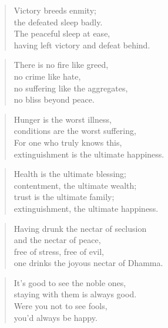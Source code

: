 \documentclass[12pt,openany]{book}%
\begin{document}
\begin{verse}%
Victory breeds enmity; \\
the defeated sleep badly. \\
The peaceful sleep at ease, \\
having left victory and defeat behind. 

%
\end{verse}

\begin{verse}%
There is no fire like greed, \\
no crime like hate, \\
no suffering like the aggregates, \\
no bliss beyond peace. 

%
\end{verse}

\begin{verse}%
Hunger is the worst illness, \\
conditions are the worst suffering, \\
For one who truly knows this, \\
extinguishment is the ultimate happiness. 

%
\end{verse}

\begin{verse}%
Health is the ultimate blessing; \\
contentment, the ultimate wealth; \\
trust is the ultimate family; \\
extinguishment, the ultimate happiness. 

%
\end{verse}

\begin{verse}%
Having drunk the nectar of seclusion \\
and the nectar of peace, \\
free of stress, free of evil, \\
one drinks the joyous nectar of Dhamma. 

%
\end{verse}

\begin{verse}%
It’s good to see the noble ones, \\
staying with them is always good. \\
Were you not to see fools, \\
you’d always be happy. 

%
\end{verse}
\end{document}
